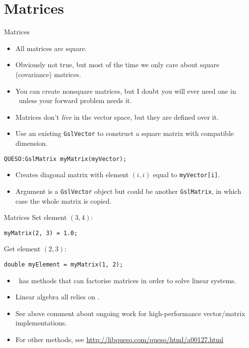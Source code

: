 \section{Matrices}
\begin{frame}[fragile]{Matrices}
  \begin{itemize}
    \item All matrices are square.
    \item Obviously not true, but most of the time we only care about square
      (covariance) matrices.
    \item You can create nonsquare matrices, but I doubt you will ever need
      one in \Queso\ unless your forward problem needs it.
    \item Matrices don't \emph{live} in the vector space, but they are defined
      over it.
    \item Use an existing \texttt{GslVector} to construct a square matrix with
      compatible dimension.
  \end{itemize}
  \begin{verbatim}
QUESO:GslMatrix myMatrix(myVector);
  \end{verbatim}
  \begin{itemize}
    \item Creates diagonal matrix with element $(i, i)$ equal to
      \texttt{myVector[i]}.
    \item Argument is a \texttt{GslVector} object but could be another
      \texttt{GslMatrix}, in which case the whole matrix is copied.
  \end{itemize}
\end{frame}

\begin{frame}[fragile]{Matrices}
  Set element $(3, 4)$:
  \begin{verbatim}
myMatrix(2, 3) = 1.0;
  \end{verbatim}
  Get element $(2, 3)$:
  \begin{verbatim}
double myElement = myMatrix(1, 2);
  \end{verbatim}
  \begin{itemize}
    \item \Queso\ has methods that can factorise matrices in order to solve
      linear systems.
    \item Linear algebra all relies on \Gsl.
    \item See above comment about ongoing work for high-performance
      vector/matrix implementations.
    \item For other methods, see
      \url{http://libqueso.com/queso/html/a00127.html}
  \end{itemize}
\end{frame}


